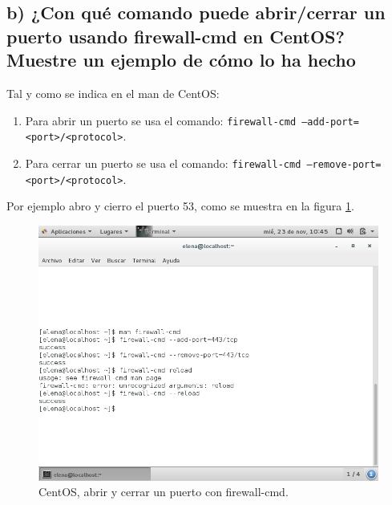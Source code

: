 \subsection{b) ¿Con qué comando puede abrir/cerrar un puerto usando firewall-cmd en CentOS? Muestre un ejemplo de cómo lo ha hecho }
Tal y como se indica en el man de CentOS:
\begin{enumerate}
	\item Para abrir un puerto se usa el comando: \texttt{firewall-cmd --add-port=<port>/<protocol>}.
	\item Para cerrar un puerto se usa el comando: \texttt{firewall-cmd --remove-port=<port>/<protocol>}. 
\end{enumerate}

Por ejemplo abro y cierro el puerto 53, como se muestra en la figura \ref{fig:ejercicio3b}.
\begin{figure}[H] 
	\centering
	\includegraphics[width=15cm]{./img/ejercicio3b.png} 	
	\caption{CentOS, abrir y cerrar un puerto con firewall-cmd.} \label{fig:ejercicio3b}
\end{figure}

